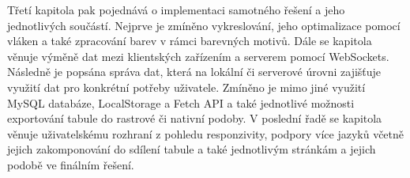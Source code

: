 Třetí kapitola pak pojednává o implementaci samotného řešení a jeho jednotlivých součástí.
Nejprve je zmíněno vykreslování, jeho optimalizace pomocí vláken a také zpracování barev v rámci barevných motivů.
Dále se kapitola věnuje výměně dat mezi klientských zařízením a serverem pomocí WebSockets.
Následně je popsána správa dat, která na lokální či serverové úrovni zajišťuje využití dat pro konkrétní potřeby uživatele.
Zmíněno je mimo jiné využití MySQL databáze, LocalStorage a Fetch API a také jednotlivé možnosti exportování tabule do rastrové či nativní podoby.
V poslední řadě se kapitola věnuje uživatelskému rozhraní z pohledu responzivity, podpory více jazyků včetně jejich zakomponování do sdílení tabule a také jednotlivým stránkám a jejich podobě ve finálním řešení.




\endinput